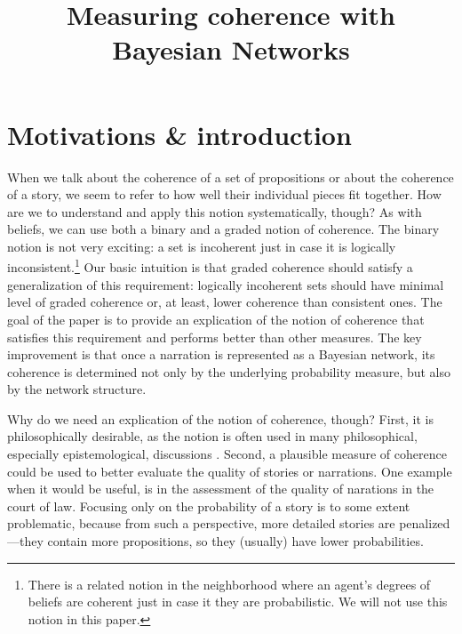 \documentclass[10pt,]{scrartcl}
\title{Measuring coherence with Bayesian Networks}
\author{}
\date{\vspace{-2.5em}}
\begin{document}
\maketitle


\section{Motivations \& introduction}


When we talk about the coherence of a set of propositions or about the 
coherence of a story, we seem to refer to how well their individual
pieces fit together. How are we to understand and apply this notion
systematically, though?  As with beliefs, we can use both a binary and a graded notion of coherence. The binary notion is not very exciting: a set is incoherent
just in case it is logically
inconsistent.\footnote{There is a related notion in the neighborhood where an agent's  degrees of beliefs are coherent just in case it they are probabilistic. We will not use this notion in this paper.}  Our basic intuition is that graded coherence should satisfy  a generalization of this requirement: logically incoherent sets should have minimal level of graded coherence or, at least, lower coherence than consistent ones.  The goal of the paper is to provide an explication of the notion of coherence    that satisfies this requirement and  performs better than other measures. The key improvement  is that  once a narration is represented as a Bayesian network, its coherence is determined not only by the underlying probability measure, but also by the network structure. 



Why do we need an explication of the notion of coherence, though? 
First, it is philosophically desirable, as  the notion is often used in many philosophical, especially
epistemological, discussions \citep[for instance, in discussions about the truth-conduciveness of coherence,][]{shogenji1999conducive,olsson2001conducive}.  Second, a  plausible measure of coherence could be used to better evaluate the quality of  stories or narrations. One example  when it would be useful, is in the assessment of the quality of  narations in the court of law. Focusing only on the probability of a story is to some extent problematic, because from such a perspective, more detailed stories are penalized---they contain more propositions, so they (usually) have lower probabilities.  
\end{document}
